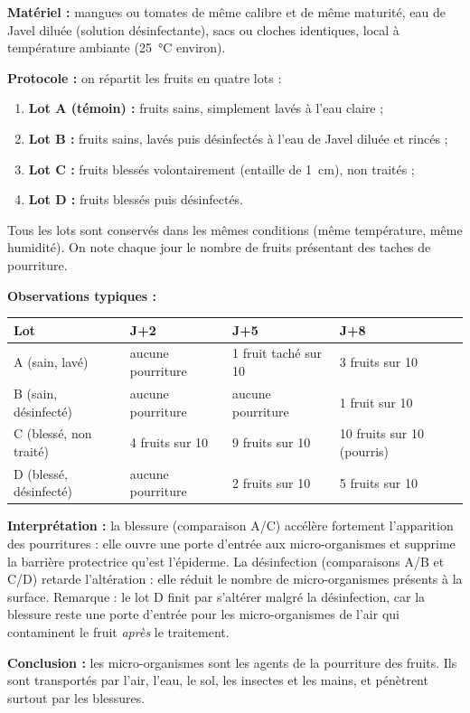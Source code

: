 \documentclass[11pt]{article}
\newcommand{\cle}[1]{{\popxbold\color{popdark}#1}}
\begin{document}
\begin{experience}
\textbf{Matériel :} mangues ou tomates de même calibre et de même maturité, eau de Javel diluée (solution désinfectante), sacs ou cloches identiques, local à température ambiante (\SI{25}{\celsius} environ).

\textbf{Protocole :} on répartit les fruits en quatre lots :
\begin{enumerate}
\item \textbf{Lot A (témoin) :} fruits sains, simplement lavés à l'eau claire ;
\item \textbf{Lot B :} fruits sains, lavés puis désinfectés à l'eau de Javel diluée et rincés ;
\item \textbf{Lot C :} fruits blessés volontairement (entaille de \SI{1}{cm}), non traités ;
\item \textbf{Lot D :} fruits blessés puis désinfectés.
\end{enumerate}
Tous les lots sont conservés dans les mêmes conditions (même température, même humidité). On note chaque jour le nombre de fruits présentant des taches de pourriture.

\textbf{Observations typiques :}
\begin{center}
\begin{tabularx}{\linewidth}{|l|X|X|X|}
\hline
\rowcolor{popblueL} \textbf{Lot} & \textbf{J+2} & \textbf{J+5} & \textbf{J+8} \\
\hline
A (sain, lavé) & aucune pourriture & 1 fruit taché sur 10 & 3 fruits sur 10 \\
\hline
B (sain, désinfecté) & aucune pourriture & aucune pourriture & 1 fruit sur 10 \\
\hline
C (blessé, non traité) & 4 fruits sur 10 & 9 fruits sur 10 & 10 fruits sur 10 (pourris) \\
\hline
D (blessé, désinfecté) & aucune pourriture & 2 fruits sur 10 & 5 fruits sur 10 \\
\hline
\end{tabularx}
\end{center}

\textbf{Interprétation :} la blessure (comparaison A/C) accélère fortement l'apparition des pourritures : elle ouvre une porte d'entrée aux micro-organismes et supprime la barrière protectrice qu'est l'épiderme. La désinfection (comparaisons A/B et C/D) retarde l'altération : elle réduit le nombre de micro-organismes présents à la surface. Remarque : le lot D finit par s'altérer malgré la désinfection, car la blessure reste une porte d'entrée pour les micro-organismes de l'air qui contaminent le fruit \emph{après} le traitement.

\textbf{Conclusion :} les \cle{micro-organismes} sont les agents de la pourriture des fruits. Ils sont transportés par l'air, l'eau, le sol, les insectes et les mains, et pénètrent surtout par les blessures.
\end{experience}
\end{document}
